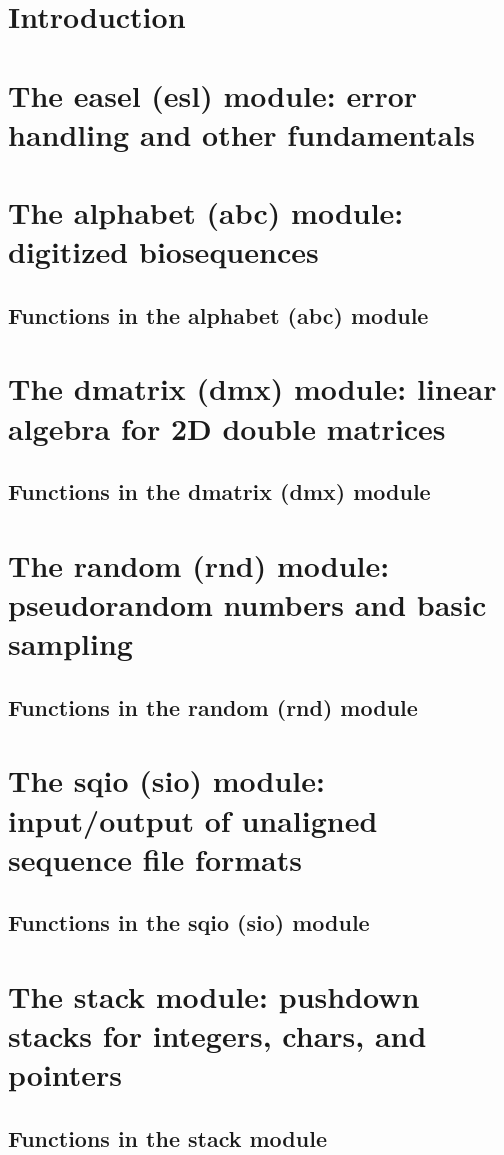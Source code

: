\documentclass[11pt]{article}
\begin{document}




\newpage
\tableofcontents

\newpage
\section{Introduction}


\newpage
\section{The easel (esl) module: error handling and other fundamentals}


\newpage
\section{The alphabet (abc) module: digitized biosequences}

\subsection{Functions in the alphabet (abc) module}


\newpage
\section{The dmatrix (dmx) module: linear algebra for 2D double matrices}
\subsection{Functions in the dmatrix (dmx) module}


\newpage
\section{The random (rnd) module: pseudorandom numbers and basic sampling}

\subsection{Functions in the random (rnd) module}


\newpage
\section{The sqio (sio) module: input/output of unaligned sequence file formats}

\subsection{Functions in the sqio (sio) module}


\newpage
\section{The stack module: pushdown stacks for integers, chars, and pointers}

\subsection{Functions in the stack module}

\end{document}

